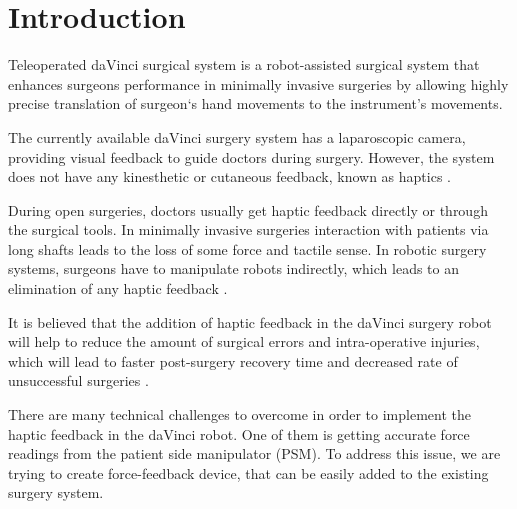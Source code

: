 \chapter{Introduction}
\label{intro} %


Teleoperated daVinci surgical system is a robot-assisted surgical 
system that enhances surgeons performance in minimally invasive surgeries by allowing highly precise translation of surgeon`s hand movements to the instrument's movements. 

The currently available daVinci surgery system 
has a laparoscopic camera, providing visual feedback to guide doctors during surgery. However, the system does not have any kinesthetic or cutaneous feedback, known as haptics \cite{_intuitive_2018}.


During open surgeries, doctors usually get haptic feedback directly or through the surgical tools. In minimally invasive surgeries interaction with patients via long shafts leads to the loss of some force and tactile sense. In robotic surgery systems, surgeons have to manipulate robots indirectly, which leads to an elimination of any haptic feedback \cite{okamura_haptic_2009}.

It is believed that the addition of haptic feedback in the daVinci surgery 
robot will help to reduce the amount of surgical errors and intra-operative 
injuries, which will lead to faster post-surgery recovery time and decreased 
rate of unsuccessful surgeries \cite{reiley_effects_2008, van_der_meijden_value_2009, okamura_haptic_2009}.

There are many technical challenges to overcome in order to implement the haptic feedback in the daVinci robot. One of them is getting accurate force readings from the patient side manipulator (PSM). To address this issue, we are trying to create force-feedback device, that can be easily added to the existing surgery system.